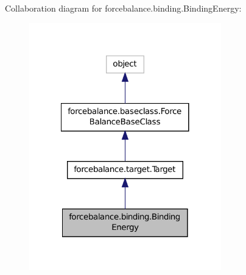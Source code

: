 Collaboration diagram for forcebalance.\-binding.\-Binding\-Energy\-:\nopagebreak
\begin{figure}[H]
\begin{center}
\leavevmode
\includegraphics[width=236pt]{classforcebalance_1_1binding_1_1BindingEnergy__coll__graph}
\end{center}
\end{figure}
